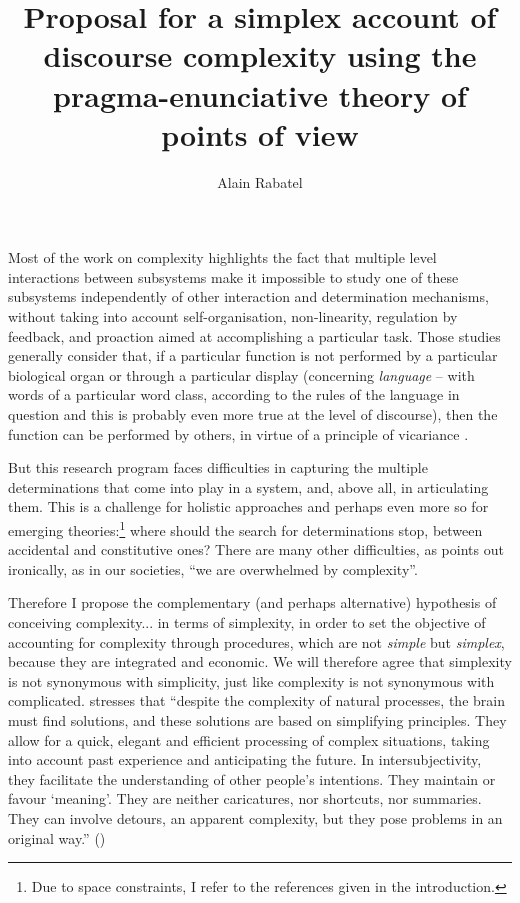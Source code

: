 \documentclass[output=paper]{langscibook}
\author{Alain Rabatel\affiliation{UMR 5161 ICAR; Centre National de la Recherche Scientifique; Ecole Normale Supérieure; Université Lumière Lyon 2; Université Claud Bernard Lyon 1}}
\title[Proposal for a simplex account of discourse complexity]
      {Proposal for a simplex account of discourse complexity using the pragma-enunciative theory of points of view}
\begin{document}
\maketitle 

Most of the work on complexity highlights the fact that multiple level interactions between subsystems make it impossible to study one of these subsystems independently of other interaction and determination mechanisms, without taking into account self-organisation, non-linearity, regulation by feedback, and proaction aimed at accomplishing a particular task. Those studies generally consider that, if a particular function is not performed by a particular biological organ or through a particular display (concerning \textit{language} -- with words of a particular word class, according to the rules of the language in question and this is probably even more true at the level of discourse), then the function can be performed by others, in virtue of a principle of vicariance \citep{Berthoz2013}.

But this research program faces difficulties in capturing the multiple determinations that come into play in a system, and, above all, in articulating them. This is a challenge for holistic approaches and perhaps even more so for emerging theories:\footnote{Due to space constraints, I refer to the references given in the introduction.} where should the search for determinations stop, between accidental and constitutive ones? There are many other difficulties, as \citet[8]{Berthoz2009} points out ironically, as in our societies, “we are overwhelmed by complexity”. 

Therefore I propose the complementary (and perhaps alternative) hypothesis of conceiving complexity... in terms of simplexity, in order to set the objective of accounting for complexity through procedures, which are not \textit{simple} but \textit{simplex}, because they are integrated and economic. We will therefore agree that simplexity is not synonymous with simplicity, just like complexity is not synonymous with complicated. \citet{Berthoz2009} stresses that “despite the complexity of natural processes, the brain must find solutions, and these solutions are based on simplifying principles. They allow for a quick, elegant and efficient processing of complex situations, taking into account past experience and anticipating the future. In intersubjectivity, they facilitate the understanding of other people’s intentions. They maintain or favour `meaning'. They are neither caricatures, nor shortcuts, nor summaries. They can involve detours, an apparent complexity, but they pose problems in an original way.” (\citeyear[7; personal translation]{Berthoz2009})
\end{document}

